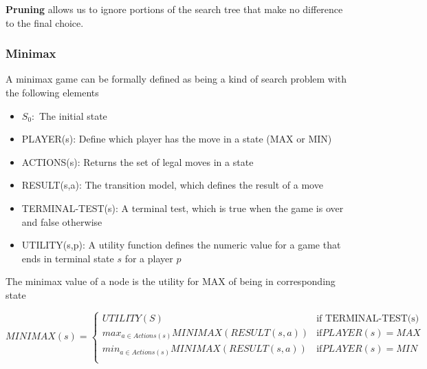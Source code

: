 \documentclass{article}
\begin{document}
\textbf{Pruning} allows us to ignore portions of the search tree that make no difference to the final choice.
\subsubsection{Minimax}

A minimax game can be formally defined as being a kind of search problem with the following elements
\begin{itemize}
    \item $S_0:$ The initial state
    \item PLAYER(s): Define which player has the move in a state (MAX or MIN)
    \item ACTIONS(s): Returns the set of legal moves in a state
    \item RESULT(s,a): The transition model, which defines the result of a move
    \item TERMINAL-TEST(s): A terminal test, which is true when the game is over and false otherwise
    \item UTILITY(s,p): A utility function defines the numeric value for a game that ends in terminal state $s$ for a player $p$
\end{itemize}

The minimax value of a node is the utility for MAX of being in corresponding state

\begin{equation}
MINIMAX(s) =
    \begin{cases}
        UTILITY(S) & \text{if TERMINAL-TEST(s)} \\
        max_{a \in Actions(s)}MINIMAX(RESULT(s,a)) & \text{if} PLAYER(s) = MAX \\
        min_{a \in Actions(s)}MINIMAX(RESULT(s,a)) & \text{if} PLAYER(s) = MIN \\
            
    \end{cases}
\end{equation}
\end{document}
